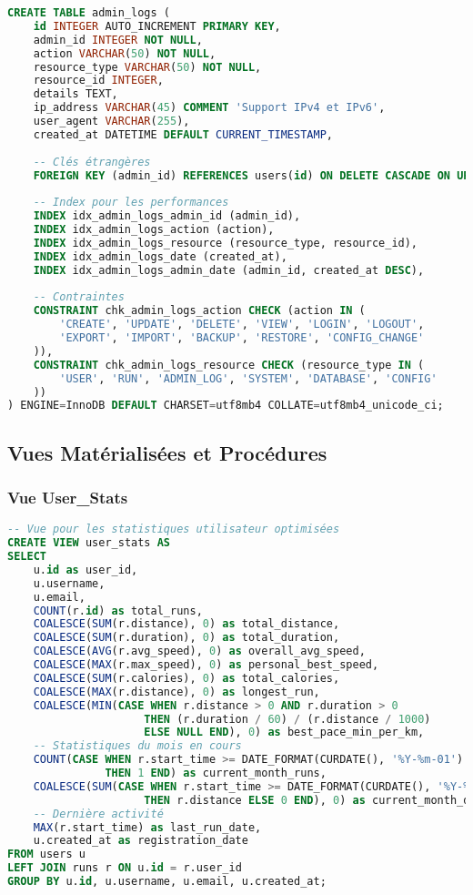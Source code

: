 \begin{lstlisting}[language=sql]
CREATE TABLE admin_logs (
    id INTEGER AUTO_INCREMENT PRIMARY KEY,
    admin_id INTEGER NOT NULL,
    action VARCHAR(50) NOT NULL,
    resource_type VARCHAR(50) NOT NULL,
    resource_id INTEGER,
    details TEXT,
    ip_address VARCHAR(45) COMMENT 'Support IPv4 et IPv6',
    user_agent VARCHAR(255),
    created_at DATETIME DEFAULT CURRENT_TIMESTAMP,
    
    -- Clés étrangères
    FOREIGN KEY (admin_id) REFERENCES users(id) ON DELETE CASCADE ON UPDATE CASCADE,
    
    -- Index pour les performances
    INDEX idx_admin_logs_admin_id (admin_id),
    INDEX idx_admin_logs_action (action),
    INDEX idx_admin_logs_resource (resource_type, resource_id),
    INDEX idx_admin_logs_date (created_at),
    INDEX idx_admin_logs_admin_date (admin_id, created_at DESC),
    
    -- Contraintes
    CONSTRAINT chk_admin_logs_action CHECK (action IN (
        'CREATE', 'UPDATE', 'DELETE', 'VIEW', 'LOGIN', 'LOGOUT', 
        'EXPORT', 'IMPORT', 'BACKUP', 'RESTORE', 'CONFIG_CHANGE'
    )),
    CONSTRAINT chk_admin_logs_resource CHECK (resource_type IN (
        'USER', 'RUN', 'ADMIN_LOG', 'SYSTEM', 'DATABASE', 'CONFIG'
    ))
) ENGINE=InnoDB DEFAULT CHARSET=utf8mb4 COLLATE=utf8mb4_unicode_ci;
\end{lstlisting}

\subsection{Vues Matérialisées et Procédures}

\subsubsection{Vue User\_Stats}

\begin{lstlisting}[language=sql]
-- Vue pour les statistiques utilisateur optimisées
CREATE VIEW user_stats AS
SELECT 
    u.id as user_id,
    u.username,
    u.email,
    COUNT(r.id) as total_runs,
    COALESCE(SUM(r.distance), 0) as total_distance,
    COALESCE(SUM(r.duration), 0) as total_duration,
    COALESCE(AVG(r.avg_speed), 0) as overall_avg_speed,
    COALESCE(MAX(r.max_speed), 0) as personal_best_speed,
    COALESCE(SUM(r.calories), 0) as total_calories,
    COALESCE(MAX(r.distance), 0) as longest_run,
    COALESCE(MIN(CASE WHEN r.distance > 0 AND r.duration > 0 
                     THEN (r.duration / 60) / (r.distance / 1000) 
                     ELSE NULL END), 0) as best_pace_min_per_km,
    -- Statistiques du mois en cours
    COUNT(CASE WHEN r.start_time >= DATE_FORMAT(CURDATE(), '%Y-%m-01') 
               THEN 1 END) as current_month_runs,
    COALESCE(SUM(CASE WHEN r.start_time >= DATE_FORMAT(CURDATE(), '%Y-%m-01') 
                     THEN r.distance ELSE 0 END), 0) as current_month_distance,
    -- Dernière activité
    MAX(r.start_time) as last_run_date,
    u.created_at as registration_date
FROM users u
LEFT JOIN runs r ON u.id = r.user_id
GROUP BY u.id, u.username, u.email, u.created_at;
\end{lstlisting}

